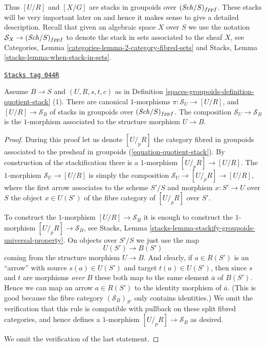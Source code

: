 Thus $[U/R]$ and $[X/G]$ are stacks in groupoids over
$(\mathit{Sch}/S)_{fppf}$. These stacks will be very important later
on and hence it makes sense to give a detailed description.
Recall that given an algebraic space $X$ over $S$ we use the
notation $\mathcal{S}_X \to (\mathit{Sch}/S)_{fppf}$ to denote
the stack in sets associated to the sheaf $X$, see
Categories, Lemma \ref{categories-lemma-2-category-fibred-sets}
and
Stacks, Lemma \ref{stacks-lemma-when-stack-in-sets}.

\begin{lemma}
\label{spaces-groupoids-lemma-quotient-stack-arrows}
\href{https://stacks.math.columbia.edu/tag/044R}{\texttt{Stacks tag 044R}}

Assume $B \to S$ and $(U, R, s, t, c)$ as in
Definition \ref{spaces-groupoids-definition-quotient-stack} (1).
There are canonical $1$-morphisms
$\pi : \mathcal{S}_U \to [U/R]$, and $[U/R] \to \mathcal{S}_B$
of stacks in groupoids over $(\mathit{Sch}/S)_{fppf}$.
The composition $\mathcal{S}_U \to \mathcal{S}_B$ is the $1$-morphism
associated to the structure morphism $U \to B$.
\end{lemma}

\begin{proof}
During this proof let us denote $[U/_{\!p}R]$ the category fibred in
groupoids associated to the presheaf in groupoids
(\ref{equation-quotient-stack}). By construction of the stackification
there is a $1$-morphism $[U/_{\!p}R] \to [U/R]$.
The $1$-morphism $\mathcal{S}_U \to [U/R]$ is simply the composition
$\mathcal{S}_U \to [U/_{\!p}R] \to [U/R]$, where the first arrow
associates to the scheme $S'/S$ and morphism $x : S' \to U$ over $S$
the object $x \in U(S')$ of the fibre category of $[U/_{\!p}R]$
over $S'$.

\medskip\noindent
To construct the $1$-morphism $[U/R] \to \mathcal{S}_B$ it is enough to
construct the $1$-morphism $[U/_{\!p}R] \to \mathcal{S}_B$, see
Stacks, Lemma \ref{stacks-lemma-stackify-groupoids-universal-property}.
On objects over $S'/S$ we just use the map
$$
U(S') \longrightarrow B(S')
$$
coming from the structure morphism $U \to B$.
And clearly, if $a \in R(S')$ is an ``arrow'' with source
$s(a) \in U(S')$ and target $t(a) \in U(S')$, then since
$s$ and $t$ are morphisms {\it over} $B$ these both
map to the same element $\overline{a}$ of $B(S')$. Hence we can map an arrow
$a \in R(S')$ to the identity morphism of $\overline{a}$. (This is
good because the fibre category $(\mathcal{S}_B)_{S'}$ only contains
identities.) We omit the verification that this rule is compatible with
pullback on these split fibred categories, and hence defines a
$1$-morphism $[U/_{\!p}R] \to \mathcal{S}_B$ as desired.

\medskip\noindent
We omit the verification of the last statement.
\end{proof}


